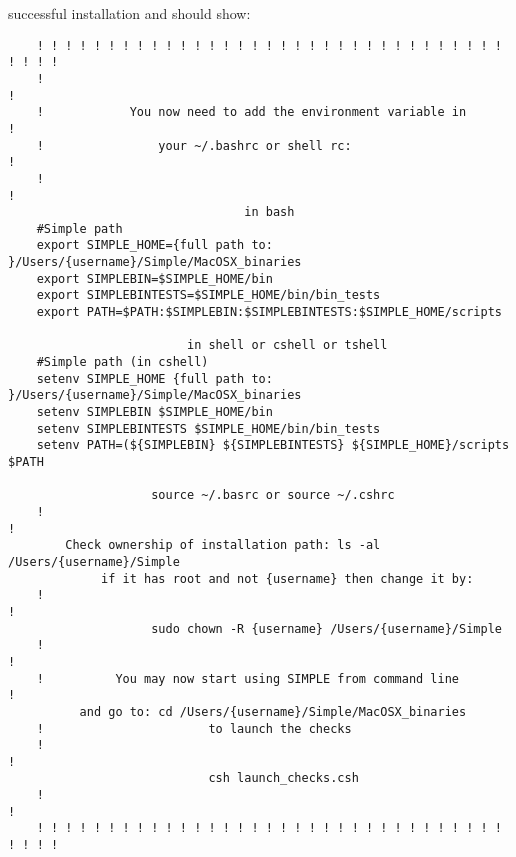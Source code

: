\documentclass[review]{elsarticle}
\begin{document}
successful installation and should show:
\begin{verbatim}
    ! ! ! ! ! ! ! ! ! ! ! ! ! ! ! ! ! ! ! ! ! ! ! ! ! ! ! ! ! ! ! ! ! ! ! ! !
    !                                                                       !
    !            You now need to add the environment variable in            !
    !                your ~/.bashrc or shell rc:                            !
    !                                                                       !
                                 in bash                                     
    #Simple path                                                             
    export SIMPLE_HOME={full path to: }/Users/{username}/Simple/MacOSX_binaries
    export SIMPLEBIN=$SIMPLE_HOME/bin                                        
    export SIMPLEBINTESTS=$SIMPLE_HOME/bin/bin_tests                         
    export PATH=$PATH:$SIMPLEBIN:$SIMPLEBINTESTS:$SIMPLE_HOME/scripts        
                                                                             
                         in shell or cshell or tshell                        
    #Simple path (in cshell)                                                 
    setenv SIMPLE_HOME {full path to: }/Users/{username}/Simple/MacOSX_binaries
    setenv SIMPLEBIN $SIMPLE_HOME/bin                                        
    setenv SIMPLEBINTESTS $SIMPLE_HOME/bin/bin_tests                         
    setenv PATH=(${SIMPLEBIN} ${SIMPLEBINTESTS} ${SIMPLE_HOME}/scripts $PATH 

                    source ~/.basrc or source ~/.cshrc                   
    !                                                                       !
        Check ownership of installation path: ls -al /Users/{username}/Simple
             if it has root and not {username} then change it by:                 
    !                                                                       !
                    sudo chown -R {username} /Users/{username}/Simple
    !                                                                       !
    !          You may now start using SIMPLE from command line             !
          and go to: cd /Users/{username}/Simple/MacOSX_binaries
    !                       to launch the checks                             
    !                                                                       !
                            csh launch_checks.csh                            
    !                                                                       !
    ! ! ! ! ! ! ! ! ! ! ! ! ! ! ! ! ! ! ! ! ! ! ! ! ! ! ! ! ! ! ! ! ! ! ! ! !
\end{verbatim}
\end{document}
